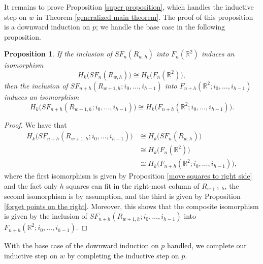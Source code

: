 \documentclass[pagebackref,colorlinks,citecolor=blue,linkcolor=blue,urlcolor=blue,filecolor=blue]{article}
\newtheorem{prop}[thm]{Proposition}
\theoremstyle{definition}\newtheorem{definition}[thm]{Definition}
\theoremstyle{definition}
\newcommand{\R}{\ensuremath{\mathbb{R}}}
\begin{document}
It remains to prove Proposition \ref{super proposition}, which handles the inductive step on $w$ in Theorem \ref{generalized main theorem}.
The proof of this proposition is a downward induction on $p$; we handle the base case in the following proposition.

\begin{prop}\label{beginning of inductive step on w}
If the inclusion of $SF_{n}(R_{w,h})$ into $F_{n}(\R^{2})$ induces an isomorphism
\[
H_{k}\big(SF_{n}(R_{w,h})\big)\cong H_{k}\big(F_{n}(\R^{2})\big),
\]
then the inclusion of $SF_{n+h}(R_{w+1,h};i_{0},\dots, i_{h-1})$ into $F_{n+h}(\R^{2};i_{0},\dots, i_{h-1})$ induces an isomorphism
\[
H_{k}\big(SF_{n+h}(R_{w+1,h};i_{0},\dots, i_{h-1})\big)\cong H_{k}\big(F_{n+h}(\R^{2};i_{0},\dots, i_{h-1})\big).
\]
\end{prop}

\begin{proof}
We have that
\begin{align*}
H_{k}\big(SF_{n+h}(R_{w+1,h};i_{0},\dots, i_{h-1})\big)&\cong H_{k}\big(SF_{n}(R_{w,h})\big)\\
&\cong H_{k}\big(F_{n}(\R^{2})\big)\\
&\cong H_{k}\big(F_{n+h}(\R^{2};i_{0},\dots, i_{h-1})\big),
\end{align*}
where the first isomorphism is given by Proposition \ref{move squares to right side} and the fact only $h$ squares can fit in the right-most column of $R_{w+1,h}$, the second isomorphism is by assumption, and the third is given by Proposition \ref{forget points on the right}.
Moreover, this shows that the composite isomorphism is given by the inclusion of $SF_{n+h}(R_{w+1,h};i_{0},\dots, i_{h-1})$ into $F_{n+h}(\R^{2};i_{0},\dots, i_{h-1})$.
\end{proof}

With the base case of the downward induction on $p$ handled, we complete our inductive step on $w$ by completing the inductive step on $p$.
\end{document}
